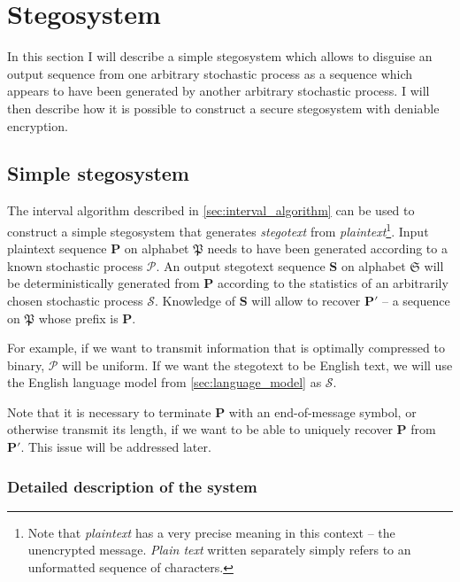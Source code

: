 \documentclass[draft]{IIBproject}
\makeatletter
\DeclareRobustCommand*{\AbbreviationWithDot}[1]{\@ifnextchar{.}{#1}{#1.\@\xspace}}
\DeclareRobustCommand*{\iid}{\AbbreviationWithDot{i.i.d}}
\makeatother
\begin{document}
\cleardoublepage
\section{Stegosystem}
\label{sec:stegosystem}

In this section I will describe a simple stegosystem which allows to disguise an output sequence from one arbitrary stochastic process as a sequence which appears to have been generated by another arbitrary stochastic process. I will then describe how it is possible to construct a secure stegosystem with deniable encryption.

\FloatBarrier
\subsection{Simple stegosystem}
\label{sec:simple_stegosystem}

The interval algorithm described in \cref{sec:interval_algorithm} can be used to construct a simple stegosystem that generates \emph{stegotext} from \emph{plaintext}\footnote{Note that \emph{plaintext} has a very precise meaning in this context -- the unencrypted message. \emph{Plain text} written separately simply refers to an unformatted sequence of characters.}. Input plaintext sequence $\mathbf P$ on alphabet $\mathfrak P$ needs to have been generated according to a known stochastic process $\mathcal P$. An output stegotext sequence $\mathbf S$ on alphabet $\mathfrak S$ will be deterministically generated from $\mathbf P$ according to the statistics of an arbitrarily chosen stochastic process $\mathcal S$. Knowledge of $\mathbf S$ will allow to recover $\mathbf{P'}$ -- a sequence on $\mathfrak P$ whose prefix is $\mathbf P$.

For example, if we want to transmit information that is optimally compressed to binary, $\mathcal P$ will be \iid uniform. If we want the stegotext to be English text, we will use the English language model from \cref{sec:language_model} as $\mathcal S$.

Note that it is necessary to terminate $\mathbf P$ with an end-of-message symbol, or otherwise transmit its length, if we want to be able to uniquely recover $\mathbf P$ from $\mathbf{P'}$. This issue will be addressed later.

\subsubsection{Detailed description of the system}
\end{document}
